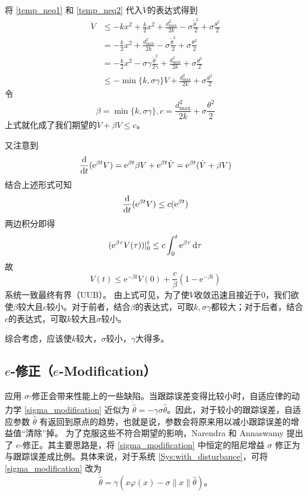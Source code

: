 将 \eqref{temp_neq1} 和 \eqref{temp_neq2} 代入$\dot{V}$的表达式得到
\begin{align*}
\dot{V} & \leq - kx^{2} + \frac{k}{2}x^{2} + \frac{d_{\max}^{2}}{2k} - \sigma\frac{{\tilde{\theta}}^{2}}{2} + \sigma\frac{\theta^{2}}{2} \\
 & = - \frac{k}{2}x^{2} + \frac{d_{\max}^{2}}{2k} - \sigma\frac{{\tilde{\theta}}^{2}}{2} + \sigma\frac{\theta^{2}}{2} \\
 & = - \frac{k}{2}x^{2} - \sigma\gamma\frac{{\tilde{\theta}}^{2}}{2\gamma} + \frac{d_{\max}^{2}}{2k} + \sigma\frac{\theta^{2}}{2} \\
 & \leq - \min\{ k,\sigma\gamma\} V + \frac{d_{\max}^{2}}{2k} + \sigma\frac{\theta^{2}}{2}
\end{align*}
令\[\beta = \min\{ k,\sigma\gamma\}, c= \frac{d_{\max}^{2}}{2k} + \sigma\frac{\theta^{2}}{2}\]
上式就化成了我们期望的$\dot{V} + \beta V \leq c$。

又注意到\[\frac{\mathop{}\!\mathrm{d}}{\mathop{}\!\mathrm{d} t}(\mathrm{e}^{\beta t} V)=\mathrm{e}^{\beta t} \beta V+\mathrm{e}^{\beta t} \dot{V}=\mathrm{e}^{\beta t}(\dot{V}+\beta V)\]
结合上述形式可知
\[\frac{\mathop{}\!\mathrm{d}}{\mathop{}\!\mathrm{d} t}(\mathrm{e}^{\beta t} V)\le c(\mathrm{e}^{\beta t})\]
两边积分即得
\[(\mathrm{e}^{\beta \tau} V(\tau))|^t_0\le c\int_0^t \mathrm{e}^{\beta\tau}\mathop{}\!\mathrm{d}\tau\]
故
\[V(t)\le \mathrm{e}^{-\beta t}V(0)+\frac{c}{\beta}(1-\mathrm{e}^{-\beta t})\]
系统一致最终有界（UUB）。
由上式可见，为了使$V$收敛迅速且接近于$0$，我们欲使\(\beta\)较大且\(c\)较小。对于前者，结合$\beta$的表达式，可取\(k,\sigma\gamma\)都较大；对于后者，结合$c$的表达式，可取\(k\)较大且\(\sigma\)较小。

综合考虑，应该使\(k\)较大，\(\sigma\)较小，\(\gamma\)大得多。

\subsection{\texorpdfstring{$e$-修正（$e$-Modification）}{e-修正（e-Modification）}}

应用 $\sigma$-修正会带来性能上的一些缺陷。当跟踪误差变得比较小时，自适应律的动力学 \eqref{sigma_modification} 近似为 $\dot{\hat{\theta}} = -\gamma \sigma\hat{\theta}$。因此，对于较小的跟踪误差，自适应参数 $\hat{\theta}$ 有返回到原点的趋势，也就是说，参数会将原来用以减小跟踪误差的增益值“清除”掉。
\newpage
为了克服这些不符合期望的影响，Narendra 和 Annaswamy 提出了 $e$-修正。其主要思路是，将 \eqref{sigma_modification} 中恒定的阻尼增益 $\sigma$ 修正为与跟踪误差成比例。具体来说，对于系统 \eqref{Sys:with_disturbance}，可将 \eqref{sigma_modification} 改为
\[
    \dot{\hat{\theta}} = \gamma \left( x\varphi(x) - \sigma \| x \| \hat{\theta} \right) \text{。}
\]

